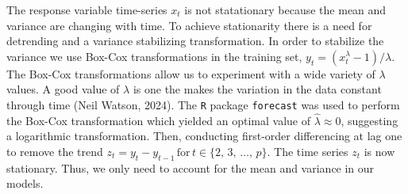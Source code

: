 \documentclass[a4paper, 10pt]{article}
\begin{document}
\begin{flushleft}
      The response variable time-series $x_{t}$ is not statationary because the mean and variance are changing with time. To achieve stationarity there is a need for detrending and a variance stabilizing transformation. In order to stabilize the variance we use Box-Cox transformations in the training set, $y_{t} = (x_{t}^{\lambda} - 1) / \lambda$. The Box-Cox transformations allow us to experiment with a wide variety of $\lambda$ values. A good value of $\lambda$ is one the makes the variation in the data constant through time (Neil Watson, 2024). The \texttt{R} package \texttt{forecast} was used to perform the Box-Cox transformation which yielded an optimal value of $\hat{\lambda} \approx 0$, suggesting a logarithmic transformation. Then, conducting first-order differencing at lag one to remove the trend $z_{t} = y_{t} - y_{t-1} \, \text{for} \, t \in \{2, \, 3, \, \ldots, \, p\}$. The time series $z_{t}$ is now stationary. Thus, we only need to account for the mean and variance in our models.      


\end{flushleft}
\end{document}

